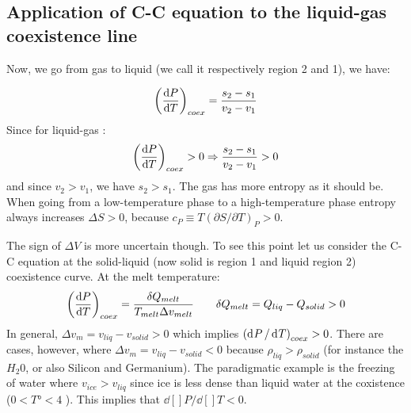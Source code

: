 \documentclass[../main/main.tex]{subfiles}
\begin{document}
\subsection{Application of C-C equation to the liquid-gas coexistence line}
 Now, we go from gas to liquid (we call it respectively region 2 and 1), we have:

\begin{equation}
  \qty(\dv{P}{T} )_{coex} = \frac{s_2 - s_1}{v_2 - v_1}
  \label{eq:}
\end{equation}
Since for liquid-gas :
\begin{equation}
  \qty(\dv{P}{T} )_{coex} > 0 \Rightarrow \frac{s_2 - s_1}{v_2 - v_1} > 0
  \label{eq:}
\end{equation}
and since \( v_2 > v_1 \), we have \( s_2 > s_1 \). The gas has more entropy as it should be. When going from a low-temperature phase to a high-temperature phase entropy always increases \( \Delta S > 0 \), because \( c_P \equiv T (\partial{S}/\partial{T}  )_P > 0 \).

The sign of \( \Delta V \) is more uncertain though. To see this point let us consider the C-C equation at the solid-liquid (now solid is region 1 and liquid region 2) coexistence curve.
At the melt temperature:
\begin{equation}
  \qty(\dv{P}{T} )_{coex} = \frac{\delta Q_{melt}}{T_{melt}\Delta v_{melt}} \qquad \delta Q_{melt} = Q_{liq} - Q_{solid} > 0
  \label{eq:}
\end{equation}
In general, \( \Delta v_m = v_{liq} - v_{solid} > 0 \) which implies \( \qty( \dd[]{P}/\dd[]{T}   )_{coex} > 0  \). There are cases, however, where \( \Delta v_m = v_{liq} - v_{solid} < 0 \) because \( \rho_{liq} > \rho _{solid} \) (for instance the \( H_2 0 \), or also Silicon and Germanium). The paradigmatic example is the freezing of water where \( v_{ice} > v_{liq} \) since ice is less dense than liquid water at the coxistence (\( 0 < T° < 4 \) ). This implies that \( \dd[]{P}/\dd[]{T} < 0   \).

\begin{example}

\end{example}

\begin{example}

\end{example}
\end{document}
